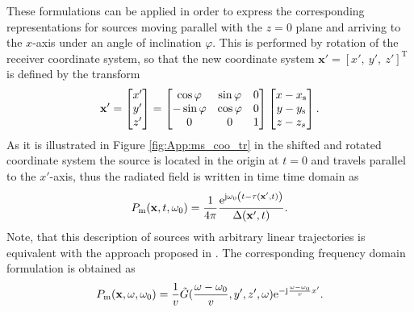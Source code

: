 These formulations can be applied in order to express the corresponding representations for sources moving parallel with the $z=0$ plane and arriving to the $x$-axis under an angle of inclination $\varphi$.
This is performed by rotation of the receiver coordinate system, so that the new coordinate system $\mathbf{x'}= [x',\ y',\ z']^{\mathrm{T}}$ is defined by the transform
%
\begin{equation}
\mathbf{x}'=
\begin{bmatrix} x' \\ y' \\ z' \end{bmatrix}
=
\begin{bmatrix}
\cos\varphi  &  \sin\varphi & 0\\
-\sin\varphi & \cos\varphi &0\\
0       &   0 &   1
\end{bmatrix}
\begin{bmatrix} x-x_\mathrm{s} \\ y-y_\mathrm{s} \\ z -z_s \end{bmatrix}.
\label{eq:transform_matrix}
\end{equation} 
%
As it is illustrated in Figure \ref{fig:App:ms_coo_tr} in the shifted and rotated coordinate system the source is located in the origin at $t = 0$ and travels parallel to the $x'$-axis, thus the radiated field is written in time time domain as
\begin{equation}
P_{\mathrm{m}}(\mathbf{x},t,\omega_0) = \frac{1}{4\pi} \frac{\mathrm{e}^{\mathrm{j} \omega_0 \left(t - \tau(\mathbf{x}',t) \right)}}{\Delta(\mathbf{x}',t)}.
\label{eq:inclined_field}
\end{equation}
Note, that this description of sources with arbitrary linear trajectories is equivalent with the approach proposed in \cite{Ahrens2008moving}.
The corresponding frequency domain formulation is obtained as
\begin{equation}
P_{\mathrm{m}}(\mathbf{x},\omega,\omega_0) =
\frac{1}{v}
\tilde{G}(\frac{\omega-\omega_0}{v}, y', z', \omega)
\mathrm{e}^{-\mathrm{j} \frac{\omega-\omega_0}{v} x'}.
\label{eq:inclined_field_omega}
\end{equation}

